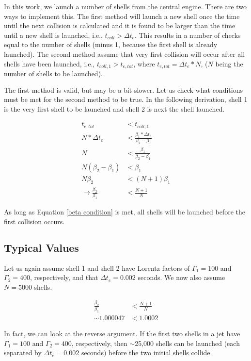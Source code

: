 \documentclass[10pt]{article}
\begin{document}
In this work, we launch a number of shells from the central engine. There are two ways to implement this. The first method will launch a new shell once the time until the next collision is calculated and it is found to be larger than the time until a new shell is launched, i.e., $t_{coll} > \Delta t_e$. This results in a number of checks equal to the number of shells (minus 1, because the first shell is already launched). The second method assume that very first collision will occur after all shells have been launched, i.e., $t_{coll,1} > t_{e,tot}$, where $t_{e,tot} = \Delta t_e * N$, ($N$ being the number of shells to be launched). 

The first method is valid, but may be a bit slower. Let us check what conditions must be met for the second method to be true. In the following derivation, shell 1 is the very first shell to be launched and shell 2 is next the shell launched.

\begin{align}
	t_{e,tot} &< t_{coll,1} \\
	N*\Delta t_e &< \frac{\beta_1 * \Delta t_e}{\beta_2 - \beta_1}\\
	N &< \frac{\beta_1}{\beta_2 - \beta_1} \\ 
	N(\beta_2 - \beta_1) &< \beta_1 \\
	N\beta_2 &< (N+1)\beta_1 \\
	\rightarrow \frac{\beta_2}{\beta_1} &< \frac{N+1}{N} \label{beta condition}
\end{align}

As long as Equation \ref{beta condition} is met, all shells will be launched before the first collision occurs. 

\subsection*{Typical Values}

Let us again assume shell 1 and shell 2 have Lorentz factors of $\Gamma_1=100$ and $\Gamma_2=400$, respectively, and that $\Delta t_e = 0.002$ seconds. We now also assume $N=5000$ shells.

\begin{align}
	\frac{\beta_2}{\beta_1} &< \frac{N+1}{N} \\
	\sim1.000047 &< 1.0002
\end{align}

In fact, we can look at the reverse argument. If the first two shells in a jet have $\Gamma_1=100$ and $\Gamma_2=400$, respectively, then $\sim$25,000 shells can be launched (each separated by $\Delta t_e = 0.002$ seconds) before the two initial shells collide.
\end{document}
